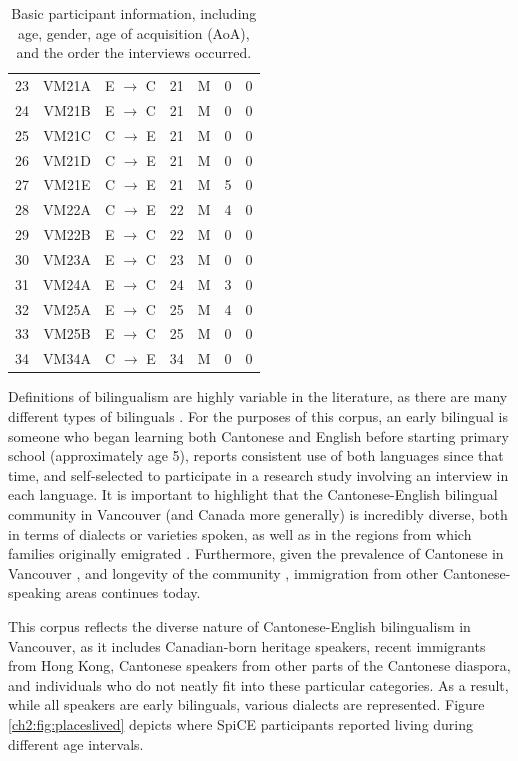 \begin{table}[!htbp]
\begin{center}
\begin{tabular}{ccccccc}
  23  & VM21A & E $\rightarrow$ C & 21  & M & 0   & 0 \\
  24  & VM21B & E $\rightarrow$ C & 21  & M & 0   & 0 \\
  25  & VM21C & C $\rightarrow$ E & 21  & M & 0   & 0 \\
  26  & VM21D & C $\rightarrow$ E & 21  & M & 0   & 0 \\
  27  & VM21E & C $\rightarrow$ E & 21  & M & 5   & 0 \\
  28  & VM22A & C $\rightarrow$ E & 22  & M & 4   & 0 \\
  29  & VM22B & E $\rightarrow$ C & 22  & M & 0   & 0 \\
  30  & VM23A & E $\rightarrow$ C & 23  & M & 0   & 0 \\
  31  & VM24A & E $\rightarrow$ C & 24  & M & 3   & 0 \\
  32  & VM25A & E $\rightarrow$ C & 25  & M & 4   & 0 \\
  33  & VM25B & E $\rightarrow$ C & 25  & M & 0   & 0 \\
  34  & VM34A & C $\rightarrow$ E & 34  & M & 0   & 0 \\
  \bottomrule
  
  \end{tabular}
  \caption{Basic participant information, including age, gender, age of acquisition (AoA), and the order the interviews occurred.}
  \label{ch2:tab:participants}
  \end{center}
  \end{table}

Definitions of bilingualism are highly variable in the literature, as there are many different types of bilinguals \citep{amengual_2017_type}. For the purposes of this corpus, an early bilingual is someone who began learning both Cantonese and English before starting primary school (approximately age 5), reports consistent use of both languages since that time, and self-selected to participate in a research study involving an interview in each language. It is important to highlight that the Cantonese-English bilingual community in Vancouver (and Canada more generally) is incredibly diverse, both in terms of dialects or varieties spoken, as well as in the regions from which families originally emigrated \citep{yu_2013_diaspora}. Furthermore, given the prevalence of Cantonese in Vancouver \citep{statistics_2017_proportion}, and longevity of the community \citep{yu_2013_diaspora}, immigration from other Cantonese-speaking areas continues today. 

This corpus reflects the diverse nature of Cantonese-English bilingualism in Vancouver, as it includes Canadian-born heritage speakers, recent immigrants from Hong Kong, Cantonese speakers from other parts of the Cantonese diaspora, and individuals who do not neatly fit into these particular categories. As a result, while all speakers are early bilinguals, various dialects are represented. Figure \ref{ch2:fig:placeslived} depicts where SpiCE participants reported living during different age intervals.

